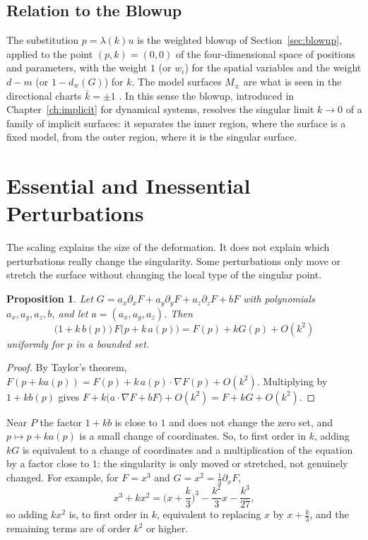 \documentclass[12pt, a4paper, oneside]{book}
\theoremstyle{plain}
\newtheorem{proposition}[theorem]{Proposition}
\theoremstyle{definition}
\theoremstyle{remark}
\theoremstyle{definition}
\begin{document}
\subsection{Relation to the Blowup}

The substitution $p=\lambda(k)u$ is the weighted blowup of Section~\ref{sec:blowup}, applied to the point $(p,k)=(0,0)$ of the four-dimensional space of positions and parameters, with the weight $1$ (or $w_i$) for the spatial variables and the weight $d-m$ (or $1-d_w(G)$) for $k$. The model surfaces $M_\pm$ are what is seen in the directional charts $\bar k=\pm1$ \cite{kristiansen2019resolution}. In this sense the blowup, introduced in Chapter~\ref{ch:implicit} for dynamical systems, resolves the singular limit $k\to0$ of a family of implicit surfaces: it separates the inner region, where the surface is a fixed model, from the outer region, where it is the singular surface.

\section{Essential and Inessential Perturbations}
\label{sec:essential}

The scaling explains the size of the deformation. It does not explain which perturbations really change the singularity. Some perturbations only move or stretch the surface without changing the local type of the singular point.

\begin{proposition}
\label{prop:first-order}
Let $G=a_x\partial_xF+a_y\partial_yF+a_z\partial_zF+bF$ with polynomials $a_x,a_y,a_z,b$, and let $a=(a_x,a_y,a_z)$. Then
\[
\big(1+k\,b(p)\big)\,F\big(p+k\,a(p)\big)=F(p)+kG(p)+O(k^2)
\]
uniformly for $p$ in a bounded set.
\end{proposition}

\begin{proof}
By Taylor's theorem, $F(p+ka(p))=F(p)+k\,a(p)\cdot\nabla F(p)+O(k^2)$. Multiplying by $1+kb(p)$ gives $F+k\big(a\cdot\nabla F+bF\big)+O(k^2)=F+kG+O(k^2)$.
\end{proof}

Near $P$ the factor $1+kb$ is close to $1$ and does not change the zero set, and $p\mapsto p+ka(p)$ is a small change of coordinates. So, to first order in $k$, adding $kG$ is equivalent to a change of coordinates and a multiplication of the equation by a factor close to $1$: the singularity is only moved or stretched, not genuinely changed. For example, for $F=x^3$ and $G=x^2=\tfrac13\partial_xF$,
\[
x^3+kx^2=\Big(x+\frac{k}{3}\Big)^3-\frac{k^2}{3}x-\frac{k^3}{27},
\]
so adding $kx^2$ is, to first order in $k$, equivalent to replacing $x$ by $x+\frac{k}{3}$, and the remaining terms are of order $k^2$ or higher.
\end{document}
